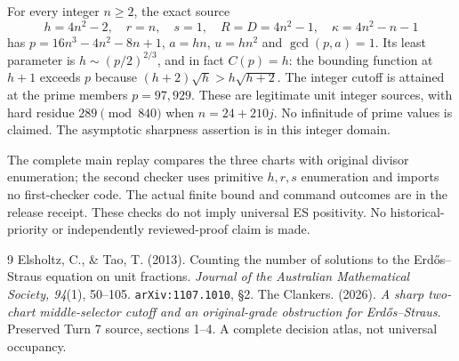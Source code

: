 \documentclass[11pt,reqno]{amsart}
\begin{document}
For every integer $n\ge2$, the exact source
\[
 h=4n^2-2,\quad r=n,\quad s=1,\quad R=D=4n^2-1,
 \quad\kappa=4n^2-n-1
\]
has $p=16n^3-4n^2-8n+1$, $a=hn$, $u=hn^2$ and $\gcd(p,a)=1$.
Its least parameter is $h\sim(p/2)^{2/3}$, and in fact $C(p)=h$: the bounding
function at $h+1$ exceeds $p$ because
$(h+2)\sqrt h>h\sqrt{h+2}$. The integer cutoff is attained at the prime
members $p=97,929$. These are legitimate unit integer
sources, with hard residue $289\pmod{840}$ when $n=24+210j$.
No infinitude of prime values is claimed. The asymptotic sharpness assertion
is in this integer domain.

The complete main replay compares the three charts with original divisor
enumeration; the second checker uses primitive $h,r,s$ enumeration and imports
no first-checker code. The actual finite bound and command outcomes are in the
release receipt. These checks do not imply universal ES positivity. No
historical-priority or independently reviewed-proof claim is made.

\begin{thebibliography}{9}
 Elsholtz, C., \& Tao, T. (2013). Counting the number of solutions to the
Erd\H{o}s--Straus equation on unit fractions. \emph{Journal of the Australian
Mathematical Society, 94}(1), 50--105. \texttt{arXiv:1107.1010}, \S2.
 The Clankers. (2026). \emph{A sharp two-chart middle-selector cutoff
and an original-grade obstruction for Erd\H{o}s--Straus}. Preserved Turn 7 source,
sections 1--4. A complete decision atlas, not universal occupancy.
\end{thebibliography}
\end{document}
